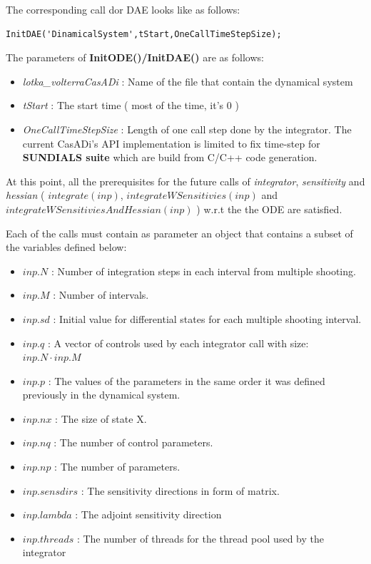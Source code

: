 \documentclass[12pt, letterpaper]{article}
\begin{document}
The corresponding call dor DAE looks like as follows:
\begin{lstlisting}
InitDAE('DinamicalSystem',tStart,OneCallTimeStepSize);
\end{lstlisting}

The parameters of \textbf{InitODE()/InitDAE()} are as follows: 

\begin{itemize}
	\item \textit{lotka\_volterraCasADi} : Name of the file that contain the dynamical system
	\item \textit{tStart} : The start time ( most of the time, it's $0$ )
	\item \textit{OneCallTimeStepSize} : Length of one call step done by the integrator. The current CasADi's API implementation is limited to fix time-step for \textbf{SUNDIALS suite} which are build from C/C++ code generation.
\end{itemize}


At this point, all the prerequisites for the future calls of \textit{integrator}, \textit{sensitivity} and \textit{hessian} ( $integrate(inp)$, $integrateWSensitivies(inp)$ and \\ $integrateWSensitiviesAndHessian(inp)$ ) w.r.t the the ODE are satisfied. 

Each of the calls must contain as parameter an object that contains a subset of the variables defined below:

\begin{itemize}
	\item $inp.N$ :  Number of integration steps in each interval from multiple shooting. 
	\item $inp.M$ : Number of intervals. 

	\item $inp.sd$ : Initial value for differential states for each multiple shooting interval.
	
	\item $inp.q$ : A vector of controls used by each integrator call with size: $inp.N \cdot inp.M$

	\item $inp.p$ : The values of the parameters in the same order it was defined previously in the dynamical system.


	\item $inp.nx$ : The size of state X.
	\item $inp.nq$ : The number of control parameters.
	\item $inp.np$ : The number of parameters.
	\item $inp.sensdirs$ : The sensitivity directions in form of matrix.
	\item $inp.lambda$ : The adjoint sensitivity direction
	\item $inp.threads$ : The number of threads for the thread pool used by the integrator
\end{itemize}
\end{document}
